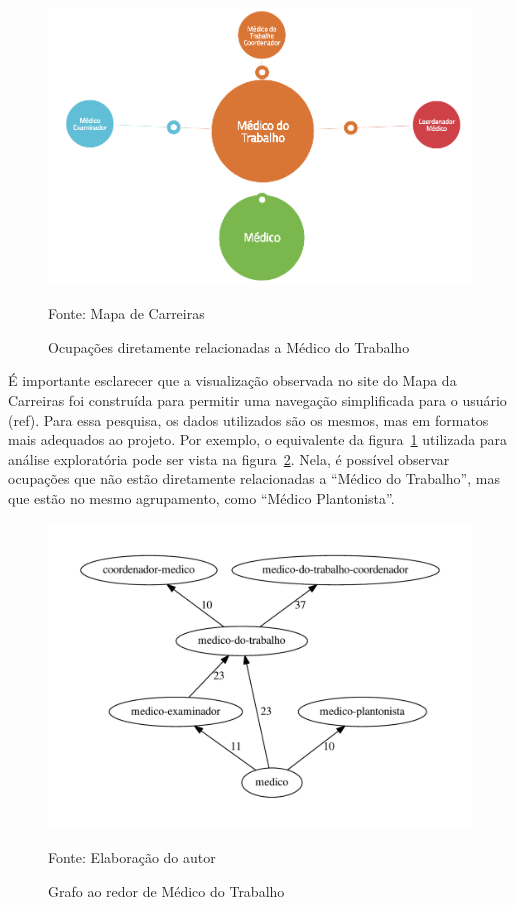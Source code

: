\documentclass[12pt,a4paper]{article}
\theoremstyle{hypo}
\newcommand{\source}[1]{\vspace{-10pt} \caption*{Fonte: {#1}} }
\begin{document}
\begin{figure}[ht]
  \centering
  \includegraphics[scale=0.25]{mapa-medico-do-trabalho.png}
  \caption{Ocupações diretamente relacionadas a Médico do Trabalho}
  \source{Mapa de Carreiras}
  \label{fig:exemplo-medico-do-trabalho}
\end{figure}


É importante esclarecer que a visualização observada no site do Mapa da Carreiras foi construída para permitir uma navegação simplificada para o usuário (ref). Para essa pesquisa, os dados utilizados são os mesmos, mas em formatos mais adequados ao projeto. Por exemplo, o equivalente da figura~\ref{fig:exemplo-medico-do-trabalho} utilizada para análise exploratória pode ser vista na figura~\ref{fig:grafo-medico-do-trabalho}. Nela, é possível observar ocupações que não estão diretamente relacionadas a \enquote{Médico do Trabalho}, mas que estão no mesmo agrupamento, como \enquote{Médico Plantonista}.

\begin{figure}[ht]
  \centering
  \includegraphics[scale=0.6]{cluster_24.pdf}
  \caption{Grafo ao redor de Médico do Trabalho}
  \source{Elaboração do autor}
  \label{fig:grafo-medico-do-trabalho}
\end{figure}
\end{document}
